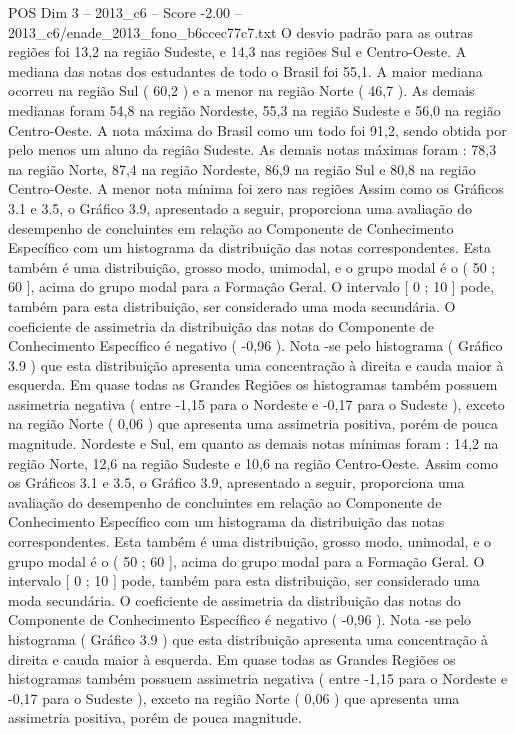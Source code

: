 \begin{textsample}{POS Dim 3 – 2013\_c6 – Score -2.00 – 2013\_c6/enade\_2013\_fono\_b6ccec77c7.txt}
O desvio padrão para as outras regiões foi 13,2 na região Sudeste, e 14,3 nas regiões Sul e Centro-Oeste.
A mediana das notas dos estudantes de todo o Brasil foi 55,1.
A maior mediana ocorreu na região Sul ( 60,2 ) e a menor na região Norte ( 46,7 ).
As demais medianas foram 54,8 na região Nordeste, 55,3 na região Sudeste e 56,0 na região Centro-Oeste.
A nota máxima do Brasil como um todo foi 91,2, sendo obtida por pelo menos um aluno da região Sudeste.
As demais notas máximas foram : 78,3 na região Norte, 87,4 na região Nordeste, 86,9 na região Sul e 80,8 na região Centro-Oeste.
A menor nota mínima foi zero nas regiões Assim como os Gráficos 3.1 e 3.5, o Gráfico 3.9, apresentado a seguir, proporciona uma avaliação do desempenho de concluintes em relação ao Componente de Conhecimento Específico com um histograma da distribuição das notas correspondentes.
Esta também é uma distribuição, grosso modo, unimodal, e o grupo modal é o ( 50 ; 60 ], acima do grupo modal para a Formação Geral.
O intervalo [ 0 ; 10 ] pode, também para esta distribuição, ser considerado uma moda secundária.
O coeficiente de assimetria da distribuição das notas do Componente de Conhecimento Específico é negativo ( -0,96 ).
Nota -se pelo histograma ( Gráfico 3.9 ) que esta distribuição apresenta uma concentração à direita e cauda maior à esquerda.
Em quase todas as Grandes Regiões os histogramas também possuem assimetria negativa ( entre -1,15 para o Nordeste e -0,17 para o Sudeste ), exceto na região Norte ( 0,06 ) que apresenta uma assimetria positiva, porém de pouca magnitude.
Nordeste e Sul, em quanto as demais notas mínimas foram : 14,2 na região Norte, 12,6 na região Sudeste e 10,6 na região Centro-Oeste.
Assim como os Gráficos 3.1 e 3.5, o Gráfico 3.9, apresentado a seguir, proporciona uma avaliação do desempenho de concluintes em relação ao Componente de Conhecimento Específico com um histograma da distribuição das notas correspondentes.
Esta também é uma distribuição, grosso modo, unimodal, e o grupo modal é o ( 50 ; 60 ], acima do grupo modal para a Formação Geral.
O intervalo [ 0 ; 10 ] pode, também para esta distribuição, ser considerado uma moda secundária.
O coeficiente de assimetria da distribuição das notas do Componente de Conhecimento Específico é negativo ( -0,96 ).
Nota -se pelo histograma ( Gráfico 3.9 ) que esta distribuição apresenta uma concentração à direita e cauda maior à esquerda.
Em quase todas as Grandes Regiões os histogramas também possuem assimetria negativa ( entre -1,15 para o Nordeste e -0,17 para o Sudeste ), exceto na região Norte ( 0,06 ) que apresenta uma assimetria positiva, porém de pouca magnitude.

\end{textsample}
